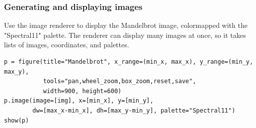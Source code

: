 \begin{frame}[fragile] \frametitle{Generating and displaying images}
Use the image renderer to display the Mandelbrot image, colormapped with the "Spectral11" palette. The renderer can display many images at once, so it takes lists of images, coordinates, and palettes.
\begin{lstlisting}
p = figure(title="Mandelbrot", x_range=(min_x, max_x), y_range=(min_y, max_y),
           tools="pan,wheel_zoom,box_zoom,reset,save",
           width=900, height=600)
p.image(image=[img], x=[min_x], y=[min_y],
        dw=[max_x-min_x], dh=[max_y-min_y], palette="Spectral11")
show(p)
\end{lstlisting}
\end{frame}
